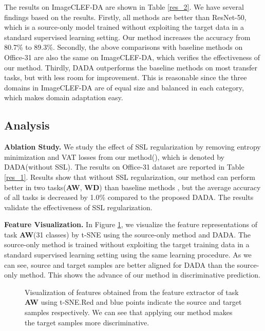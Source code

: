 \documentclass{ecai}
\begin{document}
The results on ImageCLEF-DA are shown in Table \ref{res_2}. We have several findings based on the results. Firstly, all methods are better than ResNet-50, which is a source-only model trained without exploiting the target data in a standard supervised learning setting. Our method increases the accuracy from 80.7\% to 89.3\%. Secondly, the above comparisons with baseline methods on Office-31 are also the same on ImageCLEF-DA, which verifies the effectiveness of our method. Thirdly, DADA outperforms the baseline methods on most transfer tasks, but with less room for improvement. This is reasonable since the three domains in ImageCLEF-DA are of equal size and balanced in each category, which makes domain adaptation easy.

\subsection{Analysis}

\textbf{Ablation Study.} We study the effect of SSL  regularization by removing entropy minimization and VAT losses from our method(), which is denoted by DADA(without  SSL). The results on Office-31 dataset are reported in Table \ref{res_1}.  Results show that without SSL regularization, our method can perform  better in two tasks(\textbf{A}\textbf{W}, \textbf{W}\textbf{D}) than baseline methods , but the average accuracy of all tasks is decreased by 1.0\% compared to the proposed DADA. The results validate the effectiveness of SSL regularization.


\textbf{Feature Visualization.} In Figure \ref{Visualization}, we visualize the feature representations of task \textbf{A}\textbf{W}(31 classes) by t-SNE\cite{b41} using the source-only method and DADA. The source-only method is trained without exploiting the target training data in a standard supervised learning setting using the same learning procedure. As we can see, source and target samples are better aligned for DADA than the source-only method. This shows the advance of our method in discriminative prediction.

\setlength{\abovecaptionskip}{-0.1cm}  

\begin{figure}[htbp]
\centering
{}
\caption{Visualization of features obtained from the feature extractor of task \textbf{A}\textbf{W} using t-SNE\cite{b41}.Red and blue points indicate the source and target samples respectively. We can see that applying our method makes the target samples more discriminative.}
\label{Visualization}
\end{figure}
\end{document}
